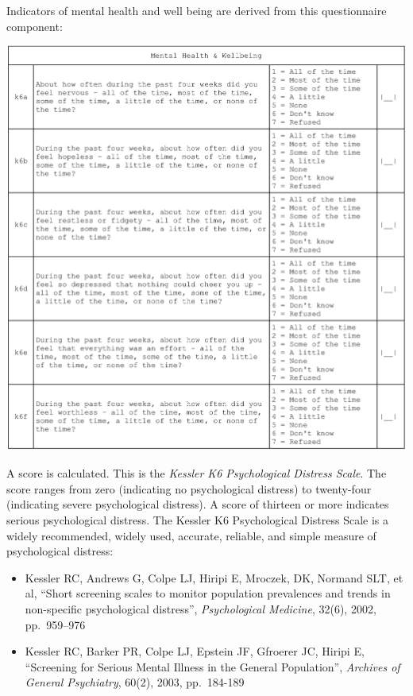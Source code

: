 \documentclass[12pt,a4paper]{book}
\theoremstyle{definition}
\theoremstyle{definition}
\theoremstyle{definition}
\theoremstyle{remark}
\begin{document}
Indicators of mental health and well being are derived from this
questionnaire component:

\begin{center}\includegraphics[width=23.86in]{figures/questionnaire06} \end{center}

A score is calculated. This is the \emph{Kessler K6 Psychological
Distress Scale}. The score ranges from zero (indicating no psychological
distress) to twenty-four (indicating severe psychological distress). A
score of thirteen or more indicates serious psychological distress. The
Kessler K6 Psychological Distress Scale is a widely recommended, widely
used, accurate, reliable, and simple measure of psychological distress:

\begin{itemize}
\item
  Kessler RC, Andrews G, Colpe LJ, Hiripi E, Mroczek, DK, Normand SLT,
  et al, ``Short screening scales to monitor population prevalences and
  trends in non-specific psychological distress'', \emph{Psychological
  Medicine}, 32(6), 2002, pp.~959--976
\item
  Kessler RC, Barker PR, Colpe LJ, Epstein JF, Gfroerer JC, Hiripi E,
  ``Screening for Serious Mental Illness in the General Population'',
  \emph{Archives of General Psychiatry}, 60(2), 2003, pp.~184-189
\end{itemize}
\end{document}
